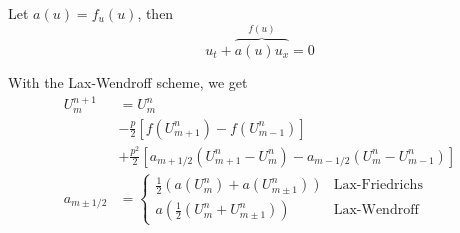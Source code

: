 Let \(a(u) = f_u(u)\), then
\[
  u_t + \overbrace{a(u)u_x}^{f(u)} = 0
\]

With the Lax-Wendroff scheme, we get
\begin{align*}
  U_m^{n+1}     & = U_m^n                                                                                     \\
                & - \frac{p}{2}\left[f(U_{m+1}^n) - f(U_{m-1}^n)\right]                                       \\
                & + \frac{p^2}{2}\left[a_{m + 1/2}(U_{m+1}^n - U_m^n) - a_{m - 1/2}(U_m^n - U_{m-1}^n)\right] \\
  a_{m \pm 1/2} & =
  \begin{cases}
    \frac{1}{2}(a(U_m^n) + a(U_{m \pm 1}^n)) & \text{Lax-Friedrichs} \\
    a(\frac{1}{2}(U_m^n + U_{m \pm 1}^n))    & \text{Lax-Wendroff}
  \end{cases}
\end{align*}